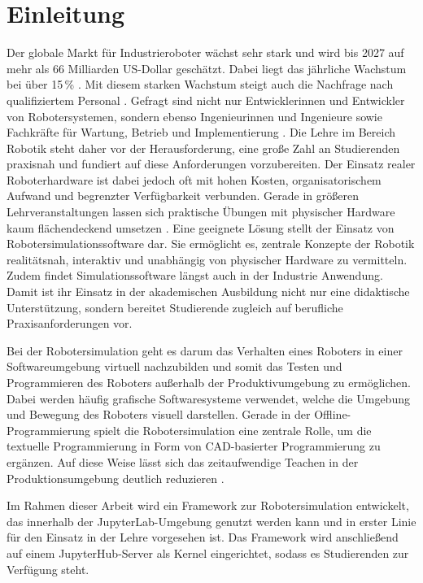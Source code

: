 \section{Einleitung}
Der globale Markt für Industrieroboter wächst sehr stark und wird bis 2027 auf mehr als 66 Milliarden US-Dollar geschätzt.
Dabei liegt das jährliche Wachstum bei über 15\,\% .
Mit diesem starken Wachstum steigt auch die Nachfrage nach qualifiziertem Personal .
Gefragt sind nicht nur Entwicklerinnen und Entwickler von Robotersystemen, sondern ebenso Ingenieurinnen und Ingenieure sowie Fachkräfte für Wartung, Betrieb und Implementierung .
Die Lehre im Bereich Robotik steht daher vor der Herausforderung, eine große Zahl an Studierenden praxisnah und fundiert auf diese Anforderungen vorzubereiten.
Der Einsatz realer Roboterhardware ist dabei jedoch oft mit hohen Kosten, organisatorischem Aufwand und begrenzter Verfügbarkeit verbunden.
Gerade in größeren Lehrveranstaltungen lassen sich praktische Übungen mit physischer Hardware kaum flächendeckend umsetzen . 
Eine geeignete Lösung stellt der Einsatz von Robotersimulationssoftware dar.
Sie ermöglicht es, zentrale Konzepte der Robotik realitätsnah, interaktiv und unabhängig von physischer Hardware zu vermitteln.
Zudem findet Simulationssoftware längst auch in der Industrie Anwendung.
Damit ist ihr Einsatz in der akademischen Ausbildung nicht nur eine didaktische Unterstützung, sondern bereitet Studierende zugleich auf berufliche Praxisanforderungen vor.  

Bei der Robotersimulation geht es darum das Verhalten eines Roboters in einer Softwareumgebung virtuell nachzubilden und
somit das Testen und Programmieren des Roboters außerhalb der Produktivumgebung zu ermöglichen.
Dabei werden häufig grafische Softwaresysteme verwendet, welche die Umgebung und Bewegung des Roboters visuell darstellen.
Gerade in der Offline-Programmierung spielt die Robotersimulation eine zentrale Rolle,
um die textuelle Programmierung in Form von CAD-basierter Programmierung zu ergänzen.
Auf diese Weise lässt sich das zeitaufwendige Teachen in der Produktionsumgebung deutlich reduzieren .
 
Im Rahmen dieser Arbeit wird ein Framework zur Robotersimulation entwickelt,
das innerhalb der JupyterLab-Umgebung genutzt werden kann und in erster Linie für den Einsatz in der Lehre vorgesehen ist.
Das Framework wird anschließend auf einem JupyterHub-Server als Kernel eingerichtet,
sodass es Studierenden zur Verfügung steht.

